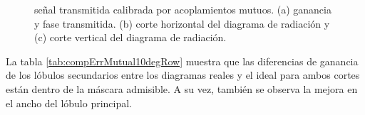 \begin{figure}[H]
	\centering

	\caption{señal transmitida calibrada por acoplamientos mutuos. (a) ganancia y fase transmitida. (b) corte horizontal del 
	diagrama de radiación y (c) corte vertical del diagrama de radiación.}
	\label{fig:compErrMutual10degRow}
\end{figure}

La tabla \ref{tab:compErrMutual10degRow} muestra que las diferencias de ganancia de los lóbulos secundarios entre los diagramas 
reales y el ideal para ambos cortes están dentro de la máscara admisible. A su vez, también se observa la mejora en el ancho 
del lóbulo principal. 

